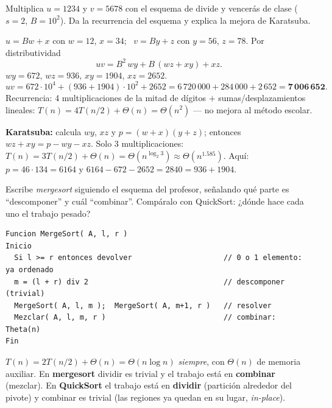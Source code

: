 \begin{prob}
Multiplica $u=1234$ y $v=5678$ con el esquema de divide y vencerás de clase ($s=2$, $B=10^2$). Da la recurrencia del esquema y explica la mejora de Karatsuba.
\end{prob}
\begin{sol}
$u=Bw+x$ con $w=12$, $x=34$; \ $v=By+z$ con $y=56$, $z=78$. Por distributividad
\[uv=B^2\,wy+B\,(wz+xy)+xz.\]
$wy=672$, $wz=936$, $xy=1904$, $xz=2652$.
\[uv=672\cdot10^4+(936+1904)\cdot10^2+2652=6\,720\,000+284\,000+2\,652=\mathbf{7\,006\,652}.\]
Recurrencia: 4 multiplicaciones de la mitad de dígitos $+$ sumas/desplazamientos lineales: $T(n)=4T(n/2)+\Theta(n)=\Theta(n^2)$ — no mejora al método escolar.

\textbf{Karatsuba:} calcula $wy$, $xz$ y $p=(w+x)(y+z)$; entonces $wz+xy=p-wy-xz$. Solo 3 multiplicaciones: $T(n)=3T(n/2)+\Theta(n)=\Theta(n^{\log_2 3})\approx\Theta(n^{1.585})$. Aquí: $p=46\cdot134=6164$ y $6164-672-2652=2840=936+1904$. \checkmark
\end{sol}

\begin{prob}
Escribe \emph{mergesort} siguiendo el esquema del profesor, señalando qué parte es ``descomponer'' y cuál ``combinar''. Compáralo con QuickSort: ¿dónde hace cada uno el trabajo pesado?
\end{prob}
\begin{sol}
\begin{lstlisting}
Funcion MergeSort( A, l, r )
Inicio
  Si l >= r entonces devolver                     // 0 o 1 elemento: ya ordenado
  m = (l + r) div 2                               // descomponer (trivial)
  MergeSort( A, l, m );  MergeSort( A, m+1, r )   // resolver
  Mezclar( A, l, m, r )                           // combinar: Theta(n)
Fin
\end{lstlisting}
$T(n)=2T(n/2)+\Theta(n)=\Theta(n\log n)$ \emph{siempre}, con $\Theta(n)$ de memoria auxiliar. En \textbf{mergesort} dividir es trivial y el trabajo está en \textbf{combinar} (mezclar). En \textbf{QuickSort} el trabajo está en \textbf{dividir} (partición alrededor del pivote) y combinar es trivial (las regiones ya quedan en su lugar, \emph{in-place}).
\end{sol}

